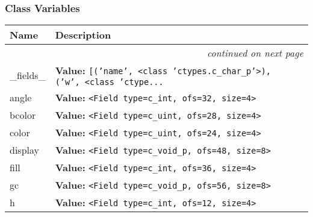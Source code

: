 
  \subsubsection{Class Variables}

    \vspace{-1cm}
\hspace{\varindent}\begin{longtable}{|p{\varnamewidth}|p{\vardescrwidth}|l}
\cline{1-2}
\cline{1-2} \centering \textbf{Name} & \centering \textbf{Description}& \\
\cline{1-2}
\endhead\cline{1-2}\multicolumn{3}{r}{\small\textit{continued on next page}}\\\endfoot\cline{1-2}
\endlastfoot\raggedright \_\-f\-i\-e\-l\-d\-s\-\_\- & \raggedright \textbf{Value:} 
{\tt \texttt{[}\texttt{(}\texttt{'}\texttt{name}\texttt{'}\texttt{, }{\textless}class 'ctypes.c\_char\_p'{\textgreater}\texttt{)}\texttt{, }\texttt{(}\texttt{'}\texttt{w}\texttt{'}\texttt{, }{\textless}class 'ctype\texttt{...}}&\\
\cline{1-2}
\raggedright a\-n\-g\-l\-e\- & \raggedright \textbf{Value:} 
{\tt {\textless}Field type=c\_int, ofs=32, size=4{\textgreater}}&\\
\cline{1-2}
\raggedright b\-c\-o\-l\-o\-r\- & \raggedright \textbf{Value:} 
{\tt {\textless}Field type=c\_uint, ofs=28, size=4{\textgreater}}&\\
\cline{1-2}
\raggedright c\-o\-l\-o\-r\- & \raggedright \textbf{Value:} 
{\tt {\textless}Field type=c\_uint, ofs=24, size=4{\textgreater}}&\\
\cline{1-2}
\raggedright d\-i\-s\-p\-l\-a\-y\- & \raggedright \textbf{Value:} 
{\tt {\textless}Field type=c\_void\_p, ofs=48, size=8{\textgreater}}&\\
\cline{1-2}
\raggedright f\-i\-l\-l\- & \raggedright \textbf{Value:} 
{\tt {\textless}Field type=c\_int, ofs=36, size=4{\textgreater}}&\\
\cline{1-2}
\raggedright g\-c\- & \raggedright \textbf{Value:} 
{\tt {\textless}Field type=c\_void\_p, ofs=56, size=8{\textgreater}}&\\
\cline{1-2}
\raggedright h\- & \raggedright \textbf{Value:} 
{\tt {\textless}Field type=c\_int, ofs=12, size=4{\textgreater}}&\\

\end{longtable}

